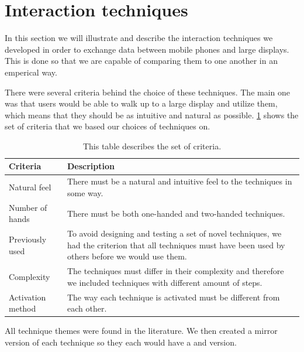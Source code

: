 \section{Interaction techniques} \label{sec:techniques}
In this section we will illustrate and describe the interaction techniques we developed in order to exchange data between mobile phones and large displays.
This is done so that we are capable of comparing them to one another in an emperical way.

There were several criteria behind the choice of these techniques. 
The main one was that users would be able to walk up to a large display and utilize them, which means that they should be as intuitive and natural as possible. 
\cref{tab:techniqueCriteria} shows the set of criteria that we based our choices of techniques on.

\begin{table}[H]
	\centering
	\begin{tabular}{|p{}|p{}|}
		\hline
		\rowcolor[HTML]{9B9B9B} 
		\textbf{Criteria} & \textbf{Description} \\ \hline
		Natural feel & There must be a natural and intuitive feel to the techniques in some way. \\ \hline
		Number of hands & There must be both one-handed and two-handed techniques. \\ \hline
		Previously used & To avoid designing and testing a set of novel techniques, we had the criterion that all techniques must have been used by others before we would use them. \\ \hline
		Complexity & The techniques must differ in their complexity and therefore we included techniques with different amount of steps. \\ \hline
		Activation method & The way each technique is activated must be different from each other. \\ \hline
	\end{tabular}
	\caption{This table describes the set of criteria.}
	\label{tab:techniqueCriteria}
\end{table}


All technique themes were found in the literature.
We then created a mirror version of each technique so they each would have a \push and \pull version.

